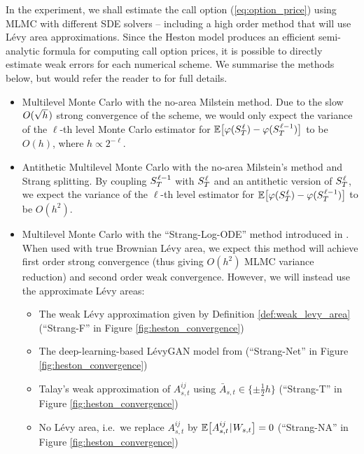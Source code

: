 \documentclass[sn-mathphys-num]{sn-jnl}%
\newcommand{\E}{\mathbb{E}}
\newcommand{\m}{\hspace{0.25mm}}
\begin{document}
In the experiment, we shall estimate the call option (\ref{eq:option_price}) using MLMC with different SDE solvers -- including a high order method that will use L\'{e}vy area approximations. 
Since the Heston model produces an efficient semi-analytic formula for computing call option prices, it is possible to directly estimate weak errors for each numerical scheme.
We summarise the methods below, but would refer the reader to \cite{jelincic2025levygan} for full details.
\begin{itemize}
\item Multilevel Monte Carlo with the no-area Milstein method. Due to the slow $O(\sqrt{h}\m)$ strong convergence of the scheme, we would only expect the variance of the $\ell$-th level Monte Carlo estimator for $\E\big[\varphi(S_T^{\m\ell}) - \varphi(S_T^{\m\ell - 1})\big]$ to be $O(h)$, where $h\propto 2^{-\ell}$.\medbreak
\item Antithetic Multilevel Monte Carlo with the no-area Milstein's method \cite{giles2014anti} and Strang splitting. By coupling $S_T^{\m\ell - 1}$ with $S_T^{\m\ell}$ and an antithetic version of $S_T^{\m\ell}$, we expect the variance of the $\ell$-th level estimator for $\E\big[\varphi(S_T^{\m\ell}) - \varphi(S_T^{\m\ell - 1})\big]$ to be $O(h^2)$.\medbreak
\item Multilevel Monte Carlo with the ``Strang-Log-ODE'' method introduced in \cite{foster2024splittingarxiv}. When used with true Brownian L\'{e}vy area, we expect this method will achieve first order strong convergence (thus giving $O(h^2)$ MLMC variance reduction) and second order weak convergence. However, we will instead use the approximate L\'{e}vy areas:
\begin{itemize}
\item The weak L\'{e}vy approximation given by Definition \ref{def:weak_levy_area} (``Strang-F'' in Figure \ref{fig:heston_convergence})\vspace{0.5mm}
\item The deep-learning-based L\'{e}vyGAN model from \cite{jelincic2025levygan} (``Strang-Net'' in Figure \ref{fig:heston_convergence})\vspace{0.5mm}
\item Talay's weak approximation of $A_{s,t}^{ij}$ using $\bar{A}_{s,t}\in\{\pm \frac{1}{2}h\}$ (``Strang-T'' in Figure \ref{fig:heston_convergence})\vspace{0.25mm}
\item No L\'{e}vy area, i.e.~we replace $A_{s,t}^{ij}$ by $\E\big[A_{s,t}^{ij}\m|\m W_{s,t}\big] = 0$ (``Strang-NA'' in Figure \ref{fig:heston_convergence})
\end{itemize}
\end{itemize}
\end{document}
